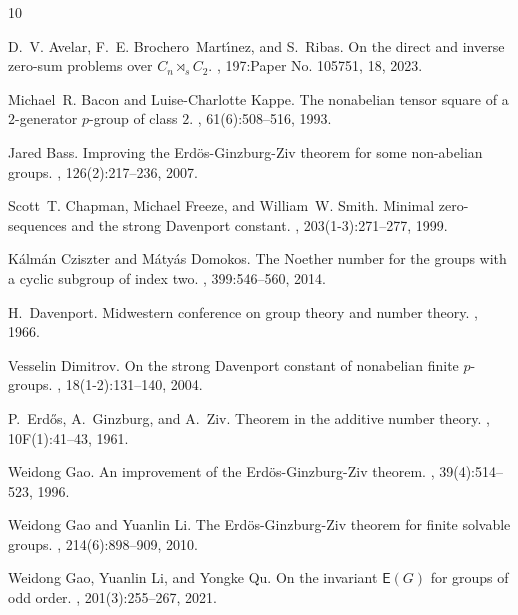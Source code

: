 \documentclass[a4paper,11pt]{article}
\numberwithin{equation}{section}
\begin{document}
\bigskip







\begin{thebibliography}{10}

D.~V. Avelar, F.~E. Brochero~Mart\'{\i}nez, and S.~Ribas.
\newblock On the direct and inverse zero-sum problems over {$C_n\rtimes_sC_2$}.
, 197:Paper No. 105751, 18, 2023.

Michael~R. Bacon and Luise-Charlotte Kappe.
\newblock The nonabelian tensor square of a {$2$}-generator {$p$}-group of class {$2$}.
, 61(6):508--516, 1993.

Jared Bass.
\newblock Improving the {E}rd\"{o}s-{G}inzburg-{Z}iv theorem for some non-abelian groups.
, 126(2):217--236, 2007.

Scott~T. Chapman, Michael Freeze, and William~W. Smith.
\newblock Minimal zero-sequences and the strong {D}avenport constant.
, 203(1-3):271--277, 1999.

K\'{a}lm\'{a}n Cziszter and M\'{a}ty\'{a}s Domokos.
\newblock The {N}oether number for the groups with a cyclic subgroup of index two.
, 399:546--560, 2014.

H.~Davenport.
\newblock Midwestern conference on group theory and number theory.
, 1966.

Vesselin Dimitrov.
\newblock On the strong {D}avenport constant of nonabelian finite $p$-groups.
, 18(1-2):131--140, 2004.

P.~Erd\H{o}s, A.~Ginzburg, and A.~Ziv.
\newblock Theorem in the additive number theory.
, 10F(1):41--43, 1961.

Weidong Gao.
\newblock An improvement of the {E}rd\"{o}s-{G}inzburg-{Z}iv theorem.
, 39(4):514--523, 1996.

Weidong Gao and Yuanlin Li.
\newblock The {E}rd\"{o}s-{G}inzburg-{Z}iv theorem for finite solvable groups.
, 214(6):898--909, 2010.

Weidong Gao, Yuanlin Li, and Yongke Qu.
\newblock On the invariant $\mathsf{E}({G})$ for groups of odd order.
, 201(3):255--267, 2021.


\end{thebibliography}
\end{document}
